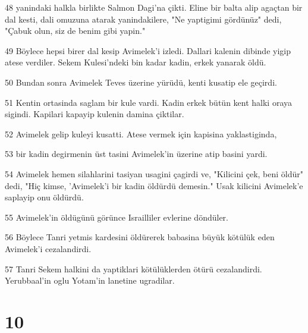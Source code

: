 \par 48 yanindaki halkla birlikte Salmon Dagi'na çikti. Eline bir balta alip agaçtan bir dal kesti, dali omuzuna atarak yanindakilere, "Ne yaptigimi gördünüz" dedi, "Çabuk olun, siz de benim gibi yapin."
\par 49 Böylece hepsi birer dal kesip Avimelek'i izledi. Dallari kalenin dibinde yigip atese verdiler. Sekem Kulesi'ndeki bin kadar kadin, erkek yanarak öldü.
\par 50 Bundan sonra Avimelek Teves üzerine yürüdü, kenti kusatip ele geçirdi.
\par 51 Kentin ortasinda saglam bir kule vardi. Kadin erkek bütün kent halki oraya sigindi. Kapilari kapayip kulenin damina çiktilar.
\par 52 Avimelek gelip kuleyi kusatti. Atese vermek için kapisina yaklastiginda,
\par 53 bir kadin degirmenin üst tasini Avimelek'in üzerine atip basini yardi.
\par 54 Avimelek hemen silahlarini tasiyan usagini çagirdi ve, "Kilicini çek, beni öldür" dedi, "Hiç kimse, 'Avimelek'i bir kadin öldürdü demesin." Usak kilicini Avimelek'e saplayip onu öldürdü.
\par 55 Avimelek'in öldügünü görünce Israilliler evlerine döndüler.
\par 56 Böylece Tanri yetmis kardesini öldürerek babasina büyük kötülük eden Avimelek'i cezalandirdi.
\par 57 Tanri Sekem halkini da yaptiklari kötülüklerden ötürü cezalandirdi. Yerubbaal'in oglu Yotam'in lanetine ugradilar.

\chapter{10}

